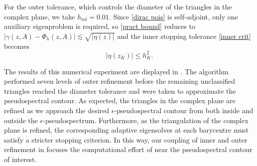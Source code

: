 

  

  For the outer tolerance, which controls the diameter of the triangles in the complex plane, we take $h_{\text{tol}} = 0.01.$ Since \eqref{dirac pois} is self-adjoint, only one auxiliary eigenproblem is required, so \eqref{pract bound} reduces to $|\gamma(z, A) - \Phi_h(z, A)| \lesssim \sqrt{|\eta(z)|}$ and the inner stopping tolerance \eqref{inner crit} becomes
  \begin{equation} 
    |\eta(z_K)| \le h_K^2.
  \end{equation}
	
  
  




  The results of this numerical experiment are displayed in . The algorithm performed seven levels of outer refinement before the remaining unclassified triangles reached the diameter tolerance and were taken to approximate the pseudospectral contour.
  As expected, the triangles in the complex plane are refined as we approach the desired $\epsilon$-pseudospectral contour from both inside and outside the $\epsilon$-pseudospectrum. Furthermore, as the triangulation of the complex plane is refined, the corresponding adaptive eigensolves at each barycentre must satisfy a stricter stopping criterion. In this way, our coupling of inner and outer refinement in  focuses the computational effort of  near the pseudospectral contour of interest. 


